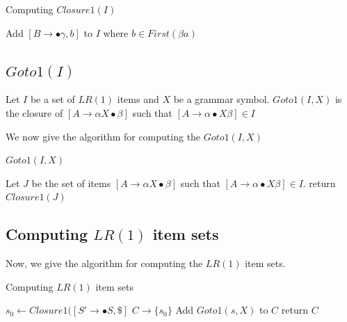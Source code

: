 \documentclass[•]{book}
\begin{document}
\begin{algorithm}
\caption{Computing $Closure1(I)$}
\begin{algorithmic}
\REPEAT
{}
\STATE Add $[B \rightarrow \bullet \gamma, b]$ to $I$ where $b \in First(\beta a)$
\ENDIF
{}
\end{algorithmic}
\end{algorithm}

\subsection{$Goto1(I)$}
Let $I$ be a set of $LR(1)$ items and $X$ be a grammar symbol. $Goto1(I,X)$ is the closure of $[A \rightarrow \alpha X \bullet \beta]$ such that $[A \rightarrow \alpha\bullet X  \beta] \in I$

We now give the algorithm for computing the $Goto1(I,X)$

\begin{algorithm}
\caption{$Goto1(I,X)$}
\begin{algorithmic}
\STATE Let $J$ be the set of items $[A \rightarrow \alpha X \bullet \beta]$ such that $[A \rightarrow \alpha\bullet X  \beta] \in I$.
\STATE return $Closure1(J)$
\end{algorithmic}
\end{algorithm}

\subsection{Computing $LR(1)$ item sets}
Now, we give the algorithm for computing the $LR(1)$ item sets.

\begin{algorithm}
\caption{Computing $LR(1)$ item sets}
\begin{algorithmic}
\STATE $s_0 \leftarrow Closure1([S' \rightarrow \bullet S, \$]$
\STATE $C \rightarrow \{s_0\}$
\REPEAT
{}
\STATE Add $Goto1(s,X)$ to $C$
\ENDIF 
\ENDFOR
\ENDFOR 
{}
\STATE return $C$ 
\end{algorithmic}
\end{algorithm}  
\end{document}
